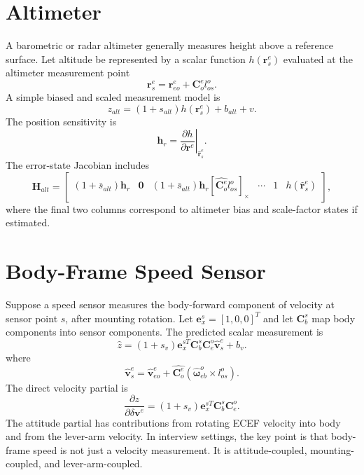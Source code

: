 \documentclass[11pt,oneside]{book}
\renewcommand{\skew}[1]{\left[#1\right]_{\times}}
\newcommand{\vb}{\mathbf{v}}
\newcommand{\rb}{\mathbf{r}}
\newcommand{\zero}{\mathbf{0}}
\newcommand{\Coe}{\mathbf{C}^{e}_{o}}
\begin{document}
\section{Altimeter}
A barometric or radar altimeter generally measures height above a reference surface. Let altitude be represented by a scalar function $h(\rb_s^e)$ evaluated at the altimeter measurement point
\begin{equation}
\rb_s^e=\rb_{eo}^e+\Coe l_{os}^o.
\end{equation}
A simple biased and scaled measurement model is
\begin{equation}
 z_{alt}=(1+s_{alt})h(\rb_s^e)+b_{alt}+v.
\end{equation}
The position sensitivity is
\begin{equation}
\mathbf{h}_r=\left.\frac{\partial h}{\partial\rb^e}\right|_{\hat{\rb}_s^e}.
\end{equation}
The error-state Jacobian includes
\begin{equation}
\mathbf{H}_{alt}=\begin{bmatrix}
(1+\bar s_{alt})\mathbf{h}_r & \zero & (1+\bar s_{alt})\mathbf{h}_r\skew{\hat{\Coe}l_{os}^o} & \cdots & 1 & h(\hat{\rb}_s^e)
\end{bmatrix},
\end{equation}
where the final two columns correspond to altimeter bias and scale-factor states if estimated.

\section{Body-Frame Speed Sensor}
Suppose a speed sensor measures the body-forward component of velocity at sensor point $s$, after mounting rotation. Let $\mathbf{e}_x^s=[1,0,0]^T$ and let $\mathbf{C}_b^s$ map body components into sensor components. The predicted scalar measurement is
\begin{equation}
\hat z=(1+s_v)\mathbf{e}_x^{sT}\mathbf{C}_b^s\mathbf{C}_e^o\hat{\vb}_s^e+b_v.
\end{equation}
where
\begin{equation}
\hat{\vb}_s^e=\hat{\vb}_{eo}^e+\hat{\Coe}(\hat{\boldsymbol\omega}_{eb}^o\times l_{os}^o).
\end{equation}
The direct velocity partial is
\begin{equation}
\frac{\partial z}{\partial\delta\vb^e}=(1+s_v)\mathbf{e}_x^{sT}\mathbf{C}_b^s\mathbf{C}_e^o.
\end{equation}
The attitude partial has contributions from rotating ECEF velocity into body and from the lever-arm velocity. In interview settings, the key point is that body-frame speed is not just a velocity measurement. It is attitude-coupled, mounting-coupled, and lever-arm-coupled.
\end{document}
